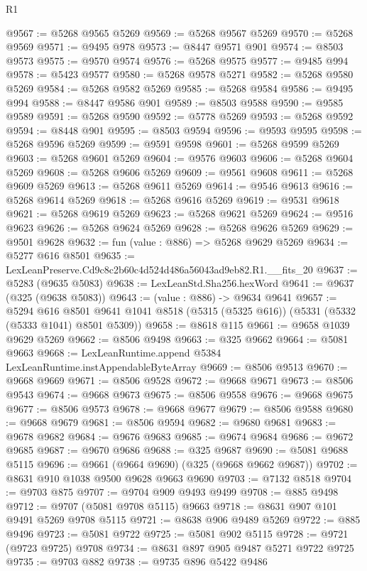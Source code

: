 \begin{lexlean}{R1}
\begin{coremodule}
@9567 := @5268 @9565 @5269
@9569 := @5268 @9567 @5269
@9570 := @5268 @9569
@9571 := @9495 @978
@9573 := @8447 @9571 @901
@9574 := @8503 @9573
@9575 := @9570 @9574
@9576 := @5268 @9575
@9577 := @9485 @994
@9578 := @5423 @9577
@9580 := @5268 @9578 @5271
@9582 := @5268 @9580 @5269
@9584 := @5268 @9582 @5269
@9585 := @5268 @9584
@9586 := @9495 @994
@9588 := @8447 @9586 @901
@9589 := @8503 @9588
@9590 := @9585 @9589
@9591 := @5268 @9590
@9592 := @5778 @5269
@9593 := @5268 @9592
@9594 := @8448 @901
@9595 := @8503 @9594
@9596 := @9593 @9595
@9598 := @5268 @9596 @5269
@9599 := @9591 @9598
@9601 := @5268 @9599 @5269
@9603 := @5268 @9601 @5269
@9604 := @9576 @9603
@9606 := @5268 @9604 @5269
@9608 := @5268 @9606 @5269
@9609 := @9561 @9608
@9611 := @5268 @9609 @5269
@9613 := @5268 @9611 @5269
@9614 := @9546 @9613
@9616 := @5268 @9614 @5269
@9618 := @5268 @9616 @5269
@9619 := @9531 @9618
@9621 := @5268 @9619 @5269
@9623 := @5268 @9621 @5269
@9624 := @9516 @9623
@9626 := @5268 @9624 @5269
@9628 := @5268 @9626 @5269
@9629 := @9501 @9628
@9632 := fun (value : @886) => @5268 @9629 @5269
@9634 := @5277 @616 @8501
@9635 := LexLeanPreserve.Cd9c8c2b60c4d524d486a56043ad9eb82.R1.__fits_20
@9637 := @5283 (@9635 @5083)
@9638 := LexLeanStd.Sha256.hexWord
@9641 := @9637 (@325 (@9638 @5083))
@9643 := (value : @886) -> @9634 @9641
@9657 := @5294
    @616
    @8501
    @9641
    @1041
    @8518
    (@5315 (@5325 @616))
    (@5331 (@5332 (@5333 @1041) @8501 @5309))
@9658 := @8618 @115
@9661 := @9658 @1039 @9629 @5269
@9662 := @8506 @9498
@9663 := @325 @9662
@9664 := @5081 @9663
@9668 := LexLeanRuntime.append @5384 LexLeanRuntime.instAppendableByteArray
@9669 := @8506 @9513
@9670 := @9668 @9669
@9671 := @8506 @9528
@9672 := @9668 @9671
@9673 := @8506 @9543
@9674 := @9668 @9673
@9675 := @8506 @9558
@9676 := @9668 @9675
@9677 := @8506 @9573
@9678 := @9668 @9677
@9679 := @8506 @9588
@9680 := @9668 @9679
@9681 := @8506 @9594
@9682 := @9680 @9681
@9683 := @9678 @9682
@9684 := @9676 @9683
@9685 := @9674 @9684
@9686 := @9672 @9685
@9687 := @9670 @9686
@9688 := @325 @9687
@9690 := @5081 @9688 @5115
@9696 := @9661 (@9664 @9690) (@325 (@9668 @9662 @9687))
@9702 := @8631 @910 @1038 @9500 @9628 @9663 @9690
@9703 := @7132 @8518
@9704 := @9703 @875
@9707 := @9704 @909 @9493 @9499
@9708 := @885 @9498
@9712 := @9707 (@5081 @9708 @5115) @9663
@9718 := @8631 @907 @101 @9491 @5269 @9708 @5115
@9721 := @8638 @906 @9489 @5269
@9722 := @885 @9496
@9723 := @5081 @9722
@9725 := @5081 @902 @5115
@9728 := @9721 (@9723 @9725) @9708
@9734 := @8631 @897 @905 @9487 @5271 @9722 @9725
@9735 := @9703 @882
@9738 := @9735 @896 @5422 @9486

\end{coremodule}
\end{lexlean}
